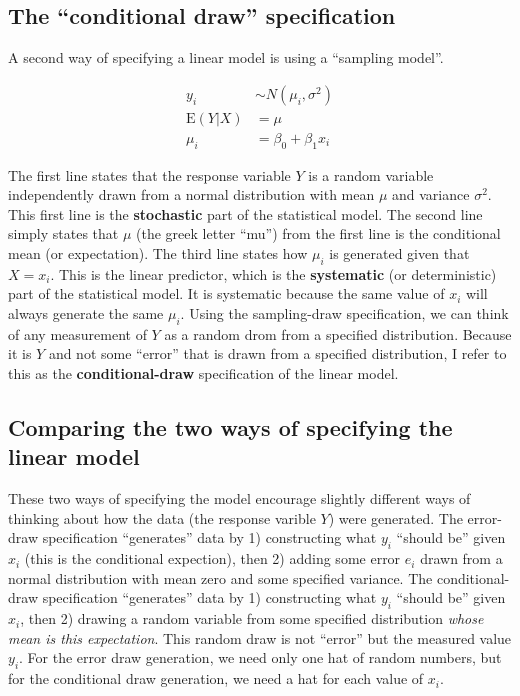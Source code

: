 \documentclass[]{book}
\begin{document}
\hypertarget{the-conditional-draw-specification}{%
\subsection{The ``conditional draw'' specification}\label{the-conditional-draw-specification}}

A second way of specifying a linear model is using a ``sampling model''.

\begin{align}
y_i &\sim N(\mu_i, \sigma^2)\\
\mathrm{E}(Y|X) &= \mu\\
\mu_i &= \beta_0 + \beta_1 x_i
\label{eq:draw-spec}
\end{align}

The first line states that the response variable \(Y\) is a random variable independently drawn from a normal distribution with mean \(\mu\) and variance \(\sigma^2\). This first line is the \textbf{stochastic} part of the statistical model. The second line simply states that \(\mu\) (the greek letter ``mu'') from the first line is the conditional mean (or expectation). The third line states how \(\mu_i\) is generated given that \(X=x_i\). This is the linear predictor, which is the \textbf{systematic} (or deterministic) part of the statistical model. It is systematic because the same value of \(x_i\) will always generate the same \(\mu_i\). Using the sampling-draw specification, we can think of any measurement of \(Y\) as a random drom from a specified distribution. Because it is \(Y\) and not some ``error'' that is drawn from a specified distribution, I refer to this as the \textbf{conditional-draw} specification of the linear model.

\hypertarget{comparing-the-two-ways-of-specifying-the-linear-model}{%
\subsection{Comparing the two ways of specifying the linear model}\label{comparing-the-two-ways-of-specifying-the-linear-model}}

These two ways of specifying the model encourage slightly different ways of thinking about how the data (the response varible \(Y\)) were generated. The error-draw specification ``generates'' data by 1) constructing what \(y_i\) ``should be'' given \(x_i\) (this is the conditional expection), then 2) adding some error \(e_i\) drawn from a normal distribution with mean zero and some specified variance. The conditional-draw specification ``generates'' data by 1) constructing what \(y_i\) ``should be'' given \(x_i\), then 2) drawing a random variable from some specified distribution \emph{whose mean is this expectation}. This random draw is not ``error'' but the measured value \(y_i\). For the error draw generation, we need only one hat of random numbers, but for the conditional draw generation, we need a hat for each value of \(x_i\).
\end{document}
